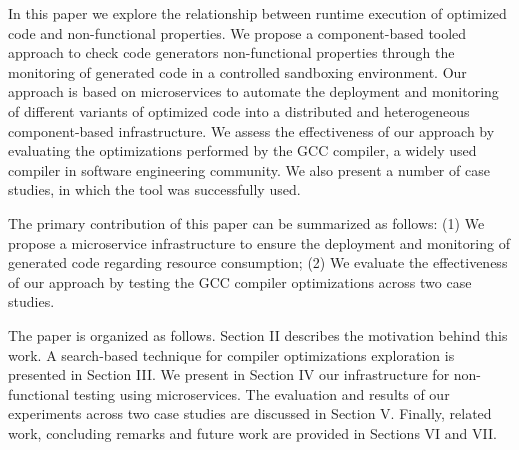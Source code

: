 In this paper we explore the relationship between runtime execution of optimized code and non-functional properties.
We propose a component-based tooled approach to check code generators non-functional properties through the monitoring of generated code in a controlled sandboxing environment. 
Our approach is based on microservices to automate the deployment and monitoring of different variants of optimized code into a distributed and heterogeneous component-based infrastructure. 
We assess the effectiveness of our approach by evaluating the optimizations performed by the GCC compiler, a widely used compiler in software engineering community. 
We also present a number of case studies, in which the tool was successfully used.

The primary contribution of this paper can be summarized as follows: 
(1) We propose a microservice infrastructure to ensure the deployment and monitoring of generated code regarding resource consumption; 
(2) We evaluate the effectiveness of our approach by testing the GCC compiler optimizations across two case studies.
 

The paper is organized as follows.
Section II describes the motivation behind this work. A search-based technique for compiler optimizations exploration is presented in Section III. 
We present in Section IV our infrastructure for non-functional testing using microservices. 
The evaluation and results of our experiments across two case studies are discussed in Section V. 
Finally, related work, concluding remarks and future work are provided in Sections VI and VII.




 
 

